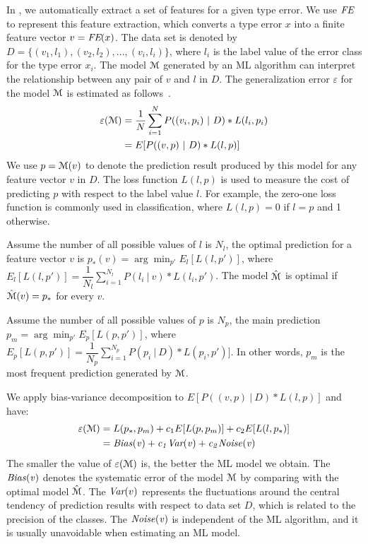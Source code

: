 \documentclass[12pt]{report}	%
\begin{document}
In \newCompiler, we automatically extract a set of features
for a given type error. We use $\textit{FE}$ to represent this feature
extraction, which converts a type error $x$ into a finite feature
vector $v=\textit{FE}(x)$. The data set is denoted by
$D = \{(v_{1}, l_{1}), (v_{2}, l_{2}),...,(v_{i}, l_{i})\}$, where
$l_{i}$ is the label value of the error class for the
type error $x_{i}$.
The model $\mathcal{M}$ generated by an ML algorithm
can interpret the relationship between any pair of 
$v$ and $l$ in $D$.
%
The generalization
error $\varepsilon$ for the model $\mathcal{M}$ is estimated as follows~\cite{domingos2000unified}.
\begin{align*}
\varepsilon({\mathcal{M}}) &= \dfrac{1}{N}\sum_{i=1}^{N} P((v_i, p_i)\ |\ D) * L(l_i, p_i) \\
&= E[P((v, p)\ |\ D) * L(l, p)]
\end{align*}
%
We use $p=\mathcal{M}(v)$ to denote 
the prediction result produced by this model for any feature vector $v$ in $D$.
The loss function $L(l, p)$ is used to measure the cost of 
predicting $p$
with respect to the label value $l$.
For example, the zero-one loss function is commonly used in classification,
where $L(l, p) = 0$ if $ l = p$ and 1 otherwise.
%
\begin{definition}
Assume the number of all possible values of $l$ is $N_l$,
the optimal prediction for a feature vector $v$ is
$p_*(v) = \arg\min_{p'}E_{l}[L(l, p')]$, 
where $E_{l}[L(l, p')] = \dfrac{1}{N_l}\sum_{i=1}^{N_l} P(l_i\ |\ v) * L(l_i, p')$.
The model $\hat{\mathcal{M}}$ is optimal if $\hat{\mathcal{M}}(v) = p_*$ for every $v$.
\end{definition}

\begin{definition}
Assume the number of all possible values of $p$ is $N_p$,
the main prediction $p_m = \arg\min_{p'}E_{p}[L(p, p')]$,
where $E_{p}[L(p, p')] = \dfrac{1}{N_p}\sum_{i=1}^{N_p} P(p_i\ |\ D) * L(p_i, p')]$.
In other words, $p_m$ is the most frequent prediction generated by ${\mathcal{M}}$.
\end{definition}

We apply bias-variance decomposition \cite{domingos2000unified}
to $E[P((v, p)\ |\ D) * L(l, p)]$ and have:
\begin{align*}
\varepsilon({\mathcal{M}}) &= L(p_*, p_m) + c_1E[L(p, p_m)] + c_2E[L(l, p_*)]  \\
&= \it{Bias}(v) + c_1\textit{Var}(v) + c_2\it{Noise}(v) 
\end{align*}
%
The smaller the value of $\varepsilon({\mathcal{M}})$ is,
the better the ML model we obtain. 
The $\it{Bias}(v)$ denotes the systematic error of the model ${\mathcal{M}}$
by comparing with the optimal model $\hat{\mathcal{M}}$.
The $\textit{Var}(v)$ represents the fluctuations around the 
central tendency of prediction results with respect to data set $D$,
which is related to the precision of the classes.
The $\it{Noise}(v)$ is independent of the ML algorithm,
and it is usually unavoidable when estimating an ML model.
\end{document}
